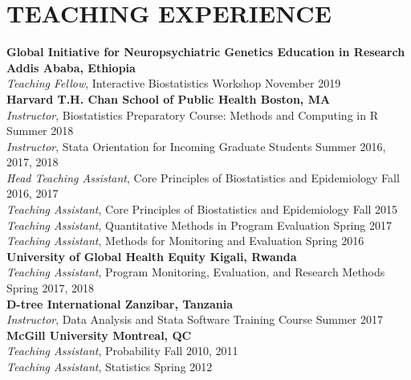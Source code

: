 \documentclass[12pt]{article}
\begin{document}


\section*{\textbf{{\large T}{EACHING} {\large E}{XPERIENCE}}}
\textbf{Global Initiative for Neuropsychiatric Genetics Education in Research \hfill \hfill Addis Ababa, Ethiopia} \\
\textit{Teaching Fellow}, Interactive Biostatistics Workshop \hfill \hfill November 2019 \\

\textbf{Harvard T.H. Chan School of Public Health \hfill \hfill Boston, MA} \\
\textit{Instructor}, Biostatistics Preparatory Course: Methods and Computing in R \hfill \hfill Summer 2018 \\
\textit{Instructor}, Stata Orientation for Incoming Graduate Students \hfill \hfill	Summer 2016, 2017, 2018\\
\textit{Head Teaching Assistant}, Core Principles of Biostatistics and Epidemiology \hfill \hfill Fall 2016, 2017 \\
\textit{Teaching Assistant}, Core Principles of Biostatistics and Epidemiology \hfill \hfill Fall 2015 \\
\textit{Teaching Assistant}, Quantitative Methods in Program Evaluation \hfill \hfill Spring 2017 \\
\textit{Teaching Assistant}, Methods for Monitoring and Evaluation \hfill \hfill Spring 2016 \\

\textbf{University of Global Health Equity \hfill \hfill Kigali, Rwanda} \\
\textit{Teaching Assistant}, Program Monitoring, Evaluation, and Research Methods  \hfill \hfill Spring 2017, 2018 \\

\textbf{D-tree International \hfill \hfill Zanzibar, Tanzania}\\
\textit{Instructor}, Data Analysis and Stata Software Training Course \hfill \hfill Summer 2017  \\

\textbf{McGill University \hfill \hfill Montreal, QC}\\
\textit{Teaching Assistant}, Probability \hfill \hfill Fall 2010, 2011 \\
\textit{Teaching Assistant}, Statistics \hfill \hfill Spring 2012 
\end{document}
